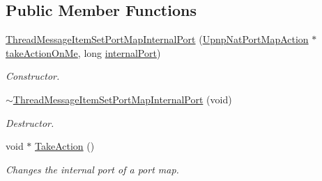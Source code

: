 \subsection*{Public Member Functions}
\begin{DoxyCompactItemize}
\item 
\hyperlink{class_thread_message_item_set_port_map_internal_port_aac9ef04b1ef39f1e75c9b28087306514}{ThreadMessageItemSetPortMapInternalPort} (\hyperlink{class_upnp_nat_port_map_action}{UpnpNatPortMapAction} $\ast$\hyperlink{class_thread_message_item_set_port_map_internal_port_a747a4267268de72c2478e81002f350da}{takeActionOnMe}, long \hyperlink{class_thread_message_item_set_port_map_internal_port_a1352fdf567a3b527c0902b2866034aa6}{internalPort})
\begin{DoxyCompactList}\small\item\em Constructor. \item\end{DoxyCompactList}\item 
\hypertarget{class_thread_message_item_set_port_map_internal_port_aeb3e8d16c0b468951f96e50a8eedb4f6}{
\hyperlink{class_thread_message_item_set_port_map_internal_port_aeb3e8d16c0b468951f96e50a8eedb4f6}{$\sim$ThreadMessageItemSetPortMapInternalPort} (void)}
\label{class_thread_message_item_set_port_map_internal_port_aeb3e8d16c0b468951f96e50a8eedb4f6}

\begin{DoxyCompactList}\small\item\em Destructor. \item\end{DoxyCompactList}\item 
void $\ast$ \hyperlink{class_thread_message_item_set_port_map_internal_port_a2a0d8bd1275cc8597343416694cc1fc4}{TakeAction} ()
\begin{DoxyCompactList}\small\item\em Changes the internal port of a port map. \item\end{DoxyCompactList}\end{DoxyCompactItemize}
